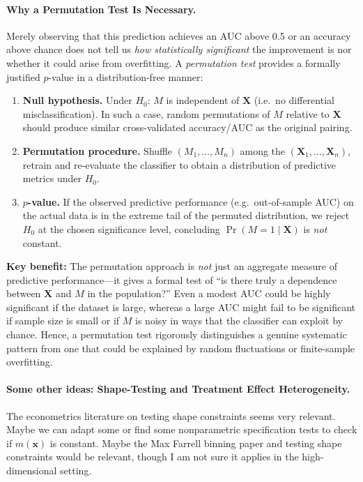 \documentclass[11pt]{article}
\begin{document}
\paragraph{Why a Permutation Test Is Necessary.}
Merely observing that this prediction achieves an AUC above 0.5 or an accuracy above chance does not tell us \emph{how statistically significant} the improvement is nor whether it could arise from overfitting.  A \emph{permutation test} provides a formally justified $p$-value in a distribution-free manner:
\begin{enumerate}
  \item \textbf{Null hypothesis.} Under $H_0$: $M$ is independent of $\mathbf{X}$ (i.e.\ no differential misclassification).  In such a case, random permutations of $M$ relative to $\mathbf{X}$ should produce similar cross-validated accuracy/AUC as the original pairing.
  \item \textbf{Permutation procedure.} Shuffle $(M_1, \dots, M_n)$ among the $(\mathbf{X}_1, \dots, \mathbf{X}_n)$, retrain and re-evaluate the classifier to obtain a distribution of predictive metrics under $H_0$.
  \item \textbf{$p$-value.} If the observed predictive performance (e.g.\ out-of-sample AUC) on the actual data is in the extreme tail of the permuted distribution, we reject $H_0$ at the chosen significance level, concluding $\Pr(M=1 \mid \mathbf{X})$ is \emph{not} constant.
\end{enumerate}
\textbf{Key benefit:} The permutation approach is \emph{not} just an aggregate measure of predictive performance---it gives a formal test of ``is there truly a dependence between $\mathbf{X}$ and $M$ in the population?'' Even a modest AUC could be highly significant if the dataset is large, whereas a large AUC might fail to be significant if sample size is small or if $M$ is noisy in ways that the classifier can exploit by chance. Hence, a permutation test rigorously distinguishes a genuine systematic pattern from one that could be explained by random fluctuations or finite-sample overfitting.


\paragraph{Some other ideas: Shape-Testing and Treatment Effect Heterogeneity.}
The econometrics literature on testing shape constraints seems very relevant. Maybe we can adapt some or find some nonparametric specification tests to check if $m(\mathbf{x})$ is constant. Maybe the Max Farrell binning paper and testing shape constraints would be relevant, though I am not sure it applies in the high-dimensional setting.
\end{document}
